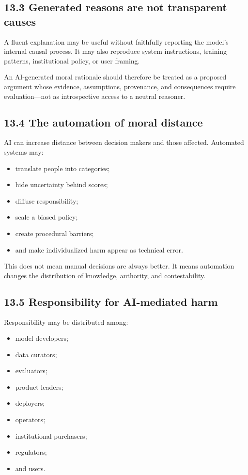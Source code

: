 \documentclass[
  11pt,
]{article}
\providecommand{\tightlist}{%
  \setlength{\itemsep}{0pt}\setlength{\parskip}{0pt}}
\begin{document}
\subsection{13.3 Generated reasons are not transparent
causes}\label{generated-reasons-are-not-transparent-causes}

A fluent explanation may be useful without faithfully reporting the
model's internal causal process. It may also reproduce system
instructions, training patterns, institutional policy, or user framing.

An AI-generated moral rationale should therefore be treated as a
proposed argument whose evidence, assumptions, provenance, and
consequences require evaluation---not as introspective access to a
neutral reasoner.

\subsection{13.4 The automation of moral
distance}\label{the-automation-of-moral-distance}

AI can increase distance between decision makers and those affected.
Automated systems may:

\begin{itemize}
\tightlist
\item
  translate people into categories;
\item
  hide uncertainty behind scores;
\item
  diffuse responsibility;
\item
  scale a biased policy;
\item
  create procedural barriers;
\item
  and make individualized harm appear as technical error.
\end{itemize}

This does not mean manual decisions are always better. It means
automation changes the distribution of knowledge, authority, and
contestability.

\subsection{13.5 Responsibility for AI-mediated
harm}\label{responsibility-for-ai-mediated-harm}

Responsibility may be distributed among:

\begin{itemize}
\tightlist
\item
  model developers;
\item
  data curators;
\item
  evaluators;
\item
  product leaders;
\item
  deployers;
\item
  operators;
\item
  institutional purchasers;
\item
  regulators;
\item
  and users.
\end{itemize}
\end{document}
